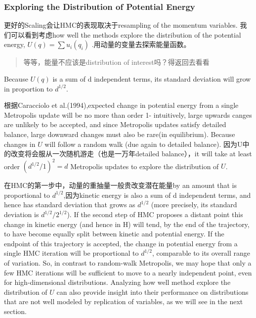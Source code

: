 \documentclass[
]{book}
\theoremstyle{definition}
\theoremstyle{definition}
\theoremstyle{definition}
\theoremstyle{remark}
\begin{document}
\hypertarget{exploring-the-distribution-of-potential-energy}{%
\subsubsection{Exploring the Distribution of Potential Energy}\label{exploring-the-distribution-of-potential-energy}}

更好的Scaling会让HMC的表现取决于resampling of the momentum variables. 我们可以看到考虑how well the methods explore the distribution of the potential energy, \(U(q)=\sum u_i(q_i)\) .用动量的变量去探索能量函数。

\begin{quote}
等等，能量不应该是distribution of interest吗？得返回去看看
\end{quote}

Because \(U(q)\) is a sum of d independent terms, its standard deviation will grow in proportion to \(d^{1/2}\).

根据Caracciolo et al.(1994),expected change in potential energy from a single Metropolis update will be no more than order 1- intuitively, large upwards canges are unlikely to be accepted, and since Metropolis updates satisfy detailed balance, large downward changes must also be rare(in equilibrium). Because changes in \(U\) will follow a random walk (due again to detailed balance). 因为U中的改变将会服从一次随机游走（也是一万年detailed balance），it will take at least order \((d^{1/2}/1)^2=d\) Metropolis updates to explore the distribution of \(U\).

在HMC的第一步中，动量的重抽量一般贵改变潜在能量by an amount that is proportional to \(d^{1/2}\),因为kinetic energy is also a sum of d independent terms, and hence has standard deviation that grows as \(d^{1/2}\) (more precisely, its standard deviation is \(d^{1/2}/2^{1/2}\)). If the second step of HMC proposes a distant point this change in kinetic energy (and hence in H) will tend, by the end of the trajectory, to have become equally split between kinetic and potential energy. If the endpoint of this trajectory is accepted, the change in potential energy from a single HMC iteration will be proportional to \(d^{1/2}\), comparable to its overall range of variation. So, in contrast to random-walk Metropolis, we may hope that only a few HMC iterations will be sufficient to move to a nearly independent point, even for high-dimensional distributions.
Analyzing how well method explore the distribution of \(U\) can also provide insight into their performance on distributions that are not well modeled by replication of variables, as we will see in the next section.
\end{document}
